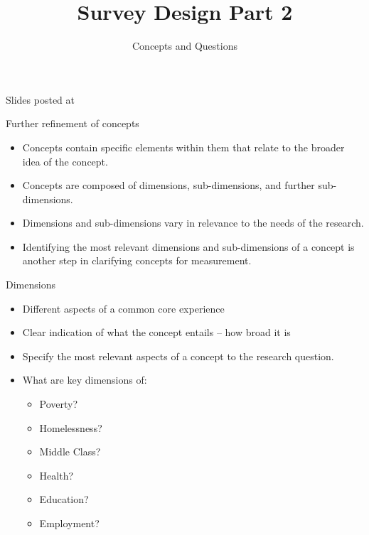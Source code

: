 \documentclass[slidestop,compress,mathserif,12pt,t,professionalfonts,xcolor=table]{beamer}
\title{Survey Design Part 2}
\subtitle{Concepts and Questions}
\author{\CourseName}
\date{}
\institute{\InstituteName}
\begin{document}



\begin{frame}[plain]

\titlepage

\vfill

{\scriptsize {} \hfill Slides posted at  \webURL{\CourseSite}}

\addtocounter{framenumber}{-1} 

\end{frame}





\begin{frame}{
Further refinement of concepts}

\begin{itemize}
\item Concepts contain specific elements within them that relate to the broader idea of the concept.
\item Concepts are composed of dimensions, sub-dimensions, and further sub-dimensions. 
\item Dimensions and sub-dimensions vary in relevance to the needs of the research. 
\item Identifying the most relevant dimensions and sub-dimensions of a concept is another step in clarifying concepts for measurement.
\end{itemize}
\end{frame}

\begin{frame}{Dimensions}

\begin{itemize}

\item Different aspects of a common core experience 

\item Clear indication of what the concept entails – how broad it is

\item Specify the most relevant aspects of a concept to the research question. 

\item What are key dimensions of: 
\begin{itemize}


\item Poverty?
\item Homelessness?
\item Middle Class?
\item Health? 
\item Education?
\item Employment?

\end{itemize}
\end{itemize}

\end{frame}
\end{document}
